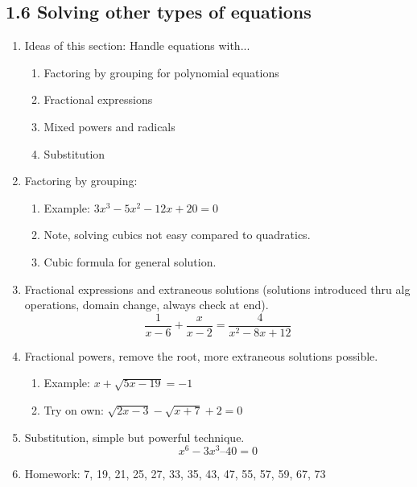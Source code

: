 \documentclass{article}
\begin{document}
\subsection{1.6 Solving other types of equations}

\begin{enumerate}

\item Ideas of this section: Handle equations with...
\begin{enumerate}
\item Factoring by grouping for polynomial equations
\item Fractional expressions
\item Mixed powers and radicals
\item Substitution
\end{enumerate}

\item Factoring by grouping:
\begin{enumerate}
\item Example: $3x^3-5x^2-12x+20=0$
\item Note, solving cubics not easy compared to quadratics.
\item Cubic formula for general solution.
\end{enumerate}

\item Fractional expressions and extraneous solutions (solutions introduced thru alg operations, domain change, always check at end).
\[
\frac{1}{x-6} + \frac{x}{x-2} = \frac{4}{x^2-8x+12}
\]

\item Fractional powers, remove the root, more extraneous solutions possible.
\begin{enumerate}
\item Example: $x+\sqrt{5x-19} = -1$
\item Try on own: $\sqrt{2x-3} - \sqrt{x+7}  + 2 = 0$
\end{enumerate}

\item Substitution, simple but powerful technique.
\[
x^6-3x^3 – 40 = 0
\]

\item Homework: 7, 19, 21, 25, 27, 33, 35, 43, 47, 55, 57, 59, 67, 73

\end{enumerate}
\end{document}

